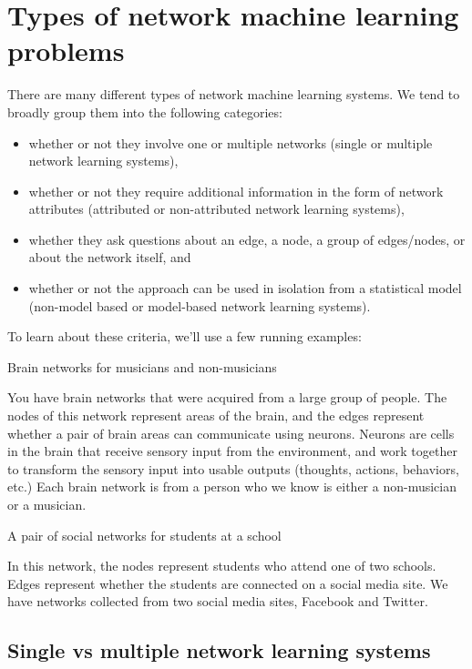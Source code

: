 \section{Types of network machine learning problems}
\label{sec:ch1:types}


There are many different types of network machine learning systems. We tend to broadly group them into the following categories:
\begin{itemize}
\item whether or not they involve one or multiple networks (single or multiple network learning systems),
\item whether or not they require additional information in the form of network attributes (attributed or non-attributed network learning systems),
\item whether they ask questions about an edge, a node, a group of edges/nodes, or about the network itself, and
\item whether or not the approach can be used in isolation from a statistical model (non-model based or model-based network learning systems).

\end{itemize}

To learn about these criteria, we'll use a few running examples:

\begin{floatingbox}[h]\caption{Brain networks for musicians and non-musicians}
\label{box:ch1:brainnet}
You have brain networks that were acquired from a large group of people. The nodes of this network represent areas of the brain, and the edges represent whether a pair of brain areas can communicate using neurons. Neurons are cells in the brain that receive sensory input from the environment, and work together to transform the sensory input into usable outputs (thoughts, actions, behaviors, etc.) Each brain network is from a person who we know is either a non-musician or a musician.
\end{floatingbox}

\begin{floatingbox}[h]\caption{A pair of social networks for students at a school}
\label{box:ch1:social}
In this network, the nodes represent students who attend one of two schools. Edges represent whether the students are connected on a social media site. We have networks collected from two social media sites, Facebook and Twitter.
\end{floatingbox}

\subsection{Single vs multiple network learning systems}


